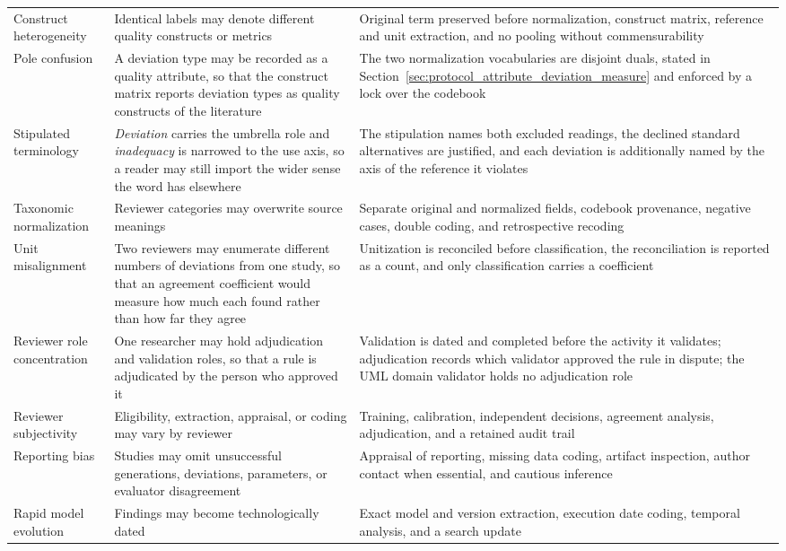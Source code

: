 \begin{longtable}{p{} p{} p{}}
Construct heterogeneity & Identical labels may denote different quality constructs or metrics & Original term preserved before normalization, construct matrix, reference and unit extraction, and no pooling without commensurability \\
Pole confusion & A deviation type may be recorded as a quality attribute, so that the construct matrix reports deviation types as quality constructs of the literature & The two normalization vocabularies are disjoint duals, stated in Section~\ref{sec:protocol_attribute_deviation_measure} and enforced by a lock over the codebook \\
Stipulated terminology & \textit{Deviation} carries the umbrella role and \textit{inadequacy} is narrowed to the use axis, so a reader may still import the wider sense the word has elsewhere & The stipulation names both excluded readings, the declined standard alternatives are justified, and each deviation is additionally named by the axis of the reference it violates \\
Taxonomic normalization & Reviewer categories may overwrite source meanings & Separate original and normalized fields, codebook provenance, negative cases, double coding, and retrospective recoding \\
Unit misalignment & Two reviewers may enumerate different numbers of deviations from one study, so that an agreement coefficient would measure how much each found rather than how far they agree & Unitization is reconciled before classification, the reconciliation is reported as a count, and only classification carries a coefficient \\
Reviewer role concentration & One researcher may hold adjudication and validation roles, so that a rule is adjudicated by the person who approved it & Validation is dated and completed before the activity it validates; adjudication records which validator approved the rule in dispute; the UML domain validator holds no adjudication role \\
Reviewer subjectivity & Eligibility, extraction, appraisal, or coding may vary by reviewer & Training, calibration, independent decisions, agreement analysis, adjudication, and a retained audit trail \\
Reporting bias & Studies may omit unsuccessful generations, deviations, parameters, or evaluator disagreement & Appraisal of reporting, missing data coding, artifact inspection, author contact when essential, and cautious inference \\
Rapid model evolution & Findings may become technologically dated & Exact model and version extraction, execution date coding, temporal analysis, and a search update \\

\end{longtable}
